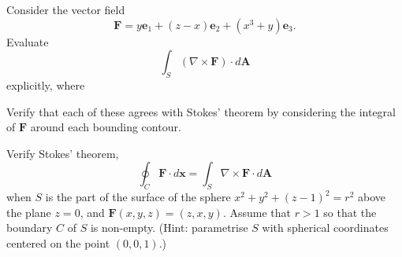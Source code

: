 
\setcounter{question}{94}
\question Consider the vector field
\[
    \bm F = y\bm e_1 + (z-x)\bm e_2 + (x^3 + y)\bm e_3.
\]
Evaluate
\[
    \int_S (\nabla \times \bm F) \cdot d\bm A
\]
explicitly, where
Verify that each of these agrees with Stokes' theorem by considering the integral
of $\bm F$ around each bounding contour.

\question Verify Stokes' theorem,
\[
    \oint_C \bm F \cdot d\bm x = \int_S \nabla \times \bm F \cdot d\bm A
\]
when $S$ is the part of the surface of the sphere $x^2 + y^2 + (z - 1)^2 = r^2$
above the plane $z = 0$, and $\bm F(x,y,z) = (z,x,y)$.
Assume that $r > 1$ so that the boundary $C$ of $S$ is non-empty.
(Hint: parametrise $S$ with spherical coordinates centered on the point $(0,0,1)$.)
